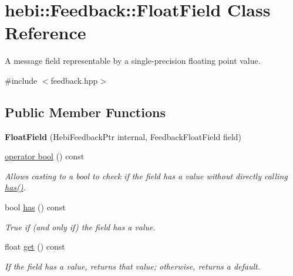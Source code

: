 \hypertarget{classhebi_1_1Feedback_1_1FloatField}{}\section{hebi\+:\+:Feedback\+:\+:Float\+Field Class Reference}
\label{classhebi_1_1Feedback_1_1FloatField}


A message field representable by a single-\/precision floating point value.  




{\ttfamily \#include $<$feedback.\+hpp$>$}

\subsection*{Public Member Functions}
\begin{DoxyCompactItemize}
\item 
{\bfseries Float\+Field} (Hebi\+Feedback\+Ptr internal, Feedback\+Float\+Field field)\hypertarget{classhebi_1_1Feedback_1_1FloatField_a7b39ccd80c26e437dcb144db4e4eed26}{}\label{classhebi_1_1Feedback_1_1FloatField_a7b39ccd80c26e437dcb144db4e4eed26}

\item 
\hyperlink{classhebi_1_1Feedback_1_1FloatField_a65bcf935d13d407d077a05a89bc3c8b4}{operator bool} () const 
\begin{DoxyCompactList}\small\item\em Allows casting to a bool to check if the field has a value without directly calling {\ttfamily \hyperlink{classhebi_1_1Feedback_1_1FloatField_a0de59918405063b9aab7114b0fb3968c}{has()}}. \end{DoxyCompactList}\item 
bool \hyperlink{classhebi_1_1Feedback_1_1FloatField_a0de59918405063b9aab7114b0fb3968c}{has} () const \hypertarget{classhebi_1_1Feedback_1_1FloatField_a0de59918405063b9aab7114b0fb3968c}{}\label{classhebi_1_1Feedback_1_1FloatField_a0de59918405063b9aab7114b0fb3968c}

\begin{DoxyCompactList}\small\item\em True if (and only if) the field has a value. \end{DoxyCompactList}\item 
float \hyperlink{classhebi_1_1Feedback_1_1FloatField_a56581c2f96de477b15e5ddb7febdd741}{get} () const \hypertarget{classhebi_1_1Feedback_1_1FloatField_a56581c2f96de477b15e5ddb7febdd741}{}\label{classhebi_1_1Feedback_1_1FloatField_a56581c2f96de477b15e5ddb7febdd741}

\begin{DoxyCompactList}\small\item\em If the field has a value, returns that value; otherwise, returns a default. \end{DoxyCompactList}\end{DoxyCompactItemize}



